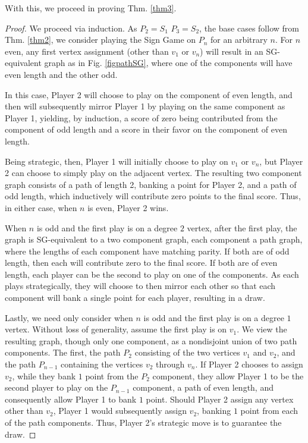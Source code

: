 \documentclass[amsart,11pt]{article}
\theoremstyle{dotless}
\theoremstyle{dotless}
\begin{document}
With this, we proceed in proving Thm. \ref{thm3}. 
\begin{proof}
    We proceed via induction. As $P_2 =S_1$ $P_3 = S_2$, the base cases follow from Thm. \ref{thm2}, we consider playing the Sign Game on $P_n$ for an arbitrary $n$. For $n$ even, any first vertex assignment (other than $v_1$ or $v_n$) will result in an SG-equivalent graph as in Fig. \ref{figpathSG}, where one of the components will have even length and the other odd. 

    In this case, Player 2 will choose to play on the component of even length, and then will subsequently mirror Player 1 by playing on the same component as Player 1, yielding, by induction, a score of zero being contributed from the component of odd length and a score in their favor on the component of even length.

    Being strategic, then, Player 1 will initially choose to play on $v_1$ or $v_n$, but Player 2 can choose to simply play on the adjacent vertex. The resulting two component graph consists of a path of length 2, banking a point for Player 2, and a path of odd length, which inductively will contribute zero points to the final score. Thus, in either case, when $n$ is even, Player 2 wins.

    When $n$ is odd and the first play is on a degree $2$ vertex, after the first play, the graph is SG-equivalent to a two component graph, each component a path graph, where the lengths of each component have matching parity. If both are of odd length, then each will contribute zero to the final score. If both are of even length, each player can be the second to play on one of the components. As each plays strategically, they will choose to then mirror each other so that each component will bank a single point for each player, resulting in a draw.

    Lastly, we need only consider when $n$ is odd and the first play is on a degree $1$ vertex. Without loss of generality, assume the first play is on $v_1$. We view the resulting graph, though only one component, as a nondisjoint union of two path components. The first, the path $P_2$ consisting of the two vertices $v_1$ and $v_2$, and the path $P_{n-1}$ containing the vertices $v_2$ through $v_n$. If Player 2 chooses to assign $v_2$, while they bank $1$ point from the $P_2$ component, they allow Player 1 to be the second player to play on the $P_{n-1}$ component, a path of even length, and consequently allow Player 1 to bank $1$ point. Should Player 2 assign any vertex other than $v_2$, Player 1 would subsequently assign $v_2$, banking $1$ point from each of the path components. Thus, Player 2's strategic move is to guarantee the draw.
\end{proof}
\end{document}
